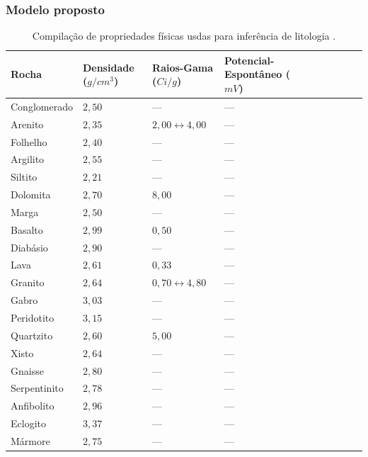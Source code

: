 \documentclass[10pt]{beamer} %
\begin{document}
\begin{frame}
	\frametitle{Modelo proposto}
 \begin{scriptsize}
	\begin{table}[H]
		\centering
		\caption{Compilação de propriedades físicas usdas para inferência de litologia \citep{Telford_1993}.}
		\label{rock-properties1}
			\begin{tabular}{@{}llllllllll@{}}
				\toprule
				Rocha         & Densidade ($g/cm^{3}$) & Raios-Gama ($Ci/g$)& Potencial-Espontâneo ($mV$)&   \\ \midrule
				Conglomerado &     $2,50$  &       ---        &    ---        &      \\
				Arenito  &    $2,35$      &       $2,00\leftrightarrow4,00$       &     ---       &      \\
				Folhelho &   $2,40$       &      ---        &      ---      &    \\
				Argilito &     $2,55$   &          ---     &       ---     &     \\
				Siltito  &      $2,21$    &          ---     &       ---     &   \\
				Dolomita &     $2,70$    &        $8,00$       &   ---         &       \\
				Marga  &    $2,50$     &         ---      &    ---        &     \\
				Basalto  &     $2,99$    &          $0,50$     &    ---       &      \\
				Diabásio &    $2,90$    &         ---      &       ---     &     \\
				Lava &     $2,61$    &      $0,33$         &      ---      &      \\
				Granito &    $2,64$      &       $0,70\leftrightarrow4,80$        &      ---      &      \\
				Gabro &    $3,03$     &       ---        &     ---       &       \\
				Peridotito &   $3,15$    &      ---         &     ---       &      \\
				Quartzito &    $2,60$    &        $5,00$      &     ---       &    \\
				Xisto &   $2,64$    &         ---      &      ---      &    \\
				Gnaisse &    $2,80$     &      ---         &    ---        &        \\
				Serpentinito &    $2,78$     &   ---            &   ---     &        \\
				Anfibolito &  $2,96$       &          ---     &       ---     &        \\
				Eclogito &  $3,37$    &       ---        &      ---      &    \\
				Mármore &   $2,75$       &      ---         &     ---       &      \\ \bottomrule
			\end{tabular}
	\end{table}
\end{scriptsize}
\end{frame}
\end{document}
